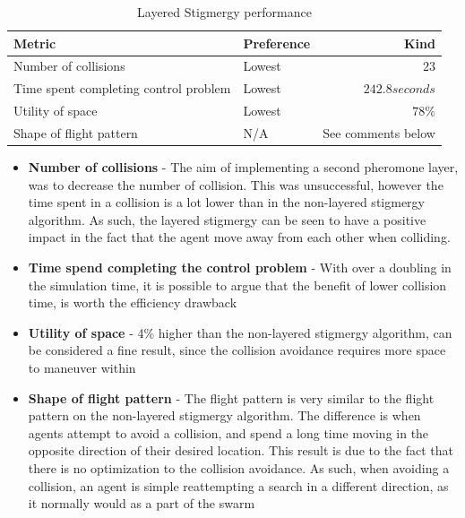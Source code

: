\begin{table}[H]
\centering
\begin{tabularx}{1\textwidth}{l@{ }Xr}
\toprule
\textbf{Metric} &\textbf{Preference} & \textbf{Kind} \\ \midrule
Number of collisions  & Lowest & $23$  \\
Time spent completing control problem & Lowest & $242.8 seconds$  \\
Utility of space & Lowest & $78\%$  \\
Shape of flight pattern  & N/A & See comments below \\
\bottomrule
\end{tabularx}
\caption{Layered Stigmergy performance}
\label{tab:stig_metrics_lay}
\end{table}

\begin{itemize}
\item{\textbf{Number of collisions} - The aim of implementing a second pheromone layer, was to decrease the number of collision. This was unsuccessful, however the time spent in a collision is a lot lower than in the non-layered stigmergy algorithm. As such, the layered stigmergy can be seen to have a positive impact in the fact that the agent move away from each other when colliding. }
\item{\textbf{Time spend completing the control problem} - With over a doubling in the simulation time, it is possible to argue that the benefit of lower collision time, is worth the efficiency drawback}
\item{\textbf{Utility of space} - 4\% higher than the non-layered stigmergy algorithm, can be considered a fine result, since the collision avoidance requires more space to maneuver within}
\item{\textbf{Shape of flight pattern} - The flight pattern is very similar to the flight pattern on the non-layered stigmergy algorithm. The difference is when agents attempt to avoid a collision, and spend a long time moving in the opposite direction of their desired location. This result is due to the fact that there is no optimization to the collision avoidance. As such, when avoiding a collision, an agent is simple reattempting a search in a different direction, as it normally would as a part of the swarm}
\end{itemize}


